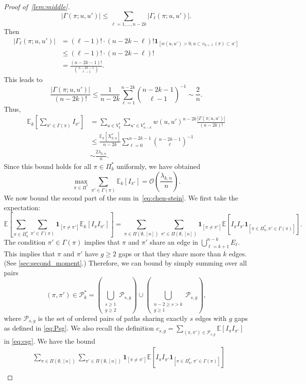 \documentclass[11pt]{article}
\theoremstyle{definition}
\theoremstyle{remark}
\theoremstyle{remark}
\numberwithin{theorem}{section}
\newcommand{\E}{\mathbb{E}}
\newcommand{\I}[1]{{\mathbf 1}_{[#1]}}
\newcommand{\bigO}{\mathcal{O}}
\begin{document}
\begin{proof}[Proof of~\cref{lem:middle}]
    \[
    |\Gamma(\pi;u,u')|\le\sum_{\ell=1,\dots,n-2k}|\Gamma_\ell(\pi;u,u')|.
    \]
    Then
    \begin{align*}
    	|\Gamma_\ell(\pi;u,u')|
    	&=(\ell-1)!\cdot (n-2k-\ell)!\I{w(u,u')>0,u\subset v_{k+\ell}(\pi) \subset u'}\\
    	&\le (\ell-1)!\cdot (n-2k-\ell)!\\
    	&=\frac{(n-2k-1)!}{{n-2k-1\choose \ell-1}}.
    \end{align*}
    This leads to
    \[
    \frac{|\Gamma(\pi;u,u')|}{(n-2k)!}\le\frac1{n-2k}\sum_{\ell=1}^{n-2k}{n-2k-1\choose \ell-1}^{-1}\sim \frac2n.
    \]
    Thus, 
    \begin{align*}
    \E_k\left[\sum_{\pi'\in\Gamma(\pi)}I_{\pi'}\right]
    &=\sum_{u\in V_k^*}\sum_{u'\in V_{n-k}^*}w(u,u')^{n-2k}\frac{|\Gamma(\pi;u,u')|}{(n-2k)!}\\
    &\le \frac{\E_k[X_{k,n}^{*}]}{n-2k}\sum_{\ell=0}^{n-2k-1}{n-2k-1\choose \ell}^{-1}\\
    &\sim\frac{2\lambda_{k,n}}{n}.
    \end{align*}
    Since this bound holds for all $\pi\in\Pi^*_k$ uniformly, we have obtained
    \[
        \max_{\pi\in\Pi^*}\sum_{\pi'\in \Gamma(\pi)}\E_k[I_{\pi'}]=\bigO\left(\frac{\lambda_{k,n}}{n}\right).
    \]
    We now bound the second part of the sum in~\eqref{eq:chen-stein}.
    We first take the expectation:
    \[
    \E\left[\sum_{\pi\in\Pi^*_k}\sum_{\pi'\in\Gamma(\pi)}\I{\pi\neq\pi'}\E_k[I_\pi I_{\pi'}]\right]=\sum_{\pi\in\Pi(\emptyset,[n])}\sum_{\pi'\in\Pi(\emptyset,[n])}\I{\pi\neq\pi'}\E[I_\pi I_{\pi'}\I{\pi\in\Pi^*_k,\pi'\in\Gamma(\pi)}].
    \] 
    The condition $\pi'\in\Gamma(\pi)$ implies that $\pi$ and $\pi'$ share an edge in $\bigcup_{\ell=k+1}^{n-k}E_\ell$.
    This implies that $\pi$ and $\pi'$ have $g \ge 2$ gaps or that they share more than $k$ edges. (See \cref{sec:second_moment}.) Therefore, we can bound by simply summing over all pairs
    \[
    (\pi,\pi')\in\mathcal P_k^*=\left(\bigcup_{\substack{s\ge 1 \\ g\ge2}}\mathcal P_{s,g}\right)\cup\left(\bigcup_{\substack{n-2 \geq s>k \\ g\ge1}}\mathcal P_{s,g}\right),
    \]
    where $\mathcal{P}_{s,g}$ is the set of ordered pairs of paths sharing exactly $s$ edges with $g$ gaps as defined in \eqref{eq:Psg}. We also recall the definition $c_{s,g} = \sum_{(\pi,\pi') \in \mathcal{P}_{s,g}}\E[I_{\pi}I_{\pi'}]$ in \eqref{eq:csg}. We have the bound
    \begin{align*}
        &\sum_{\pi\in \Pi(\emptyset,[n])}\sum_{\pi'\in\Pi(\emptyset,[n])}\I{\pi\neq\pi'}\E[I_\pi I_{\pi'}\I{\pi\in\Pi^*_k,\pi'\in\Gamma(\pi)}]\\

\end{align*}
\end{proof}
\end{document}
